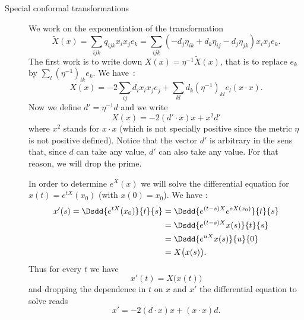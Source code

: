 \begin{description}
\item[Special conformal transformations]

    We work on the exponentiation of the transformation
    \begin{equation}
        \tilde X(x)=\sum_{ijk}q_{ijk}x_ix_je_k=\sum_{ijk}(-d_j\eta_{ik}+d_k\eta_{ij}-d_j\eta_{jk})x_ix_je_k.
    \end{equation}
    The first work is to write down \( X(x)=\eta^{-1}\tilde X(x)\), that is to replace \( e_k\) by \( \sum_l(\eta^{-1})_{lk}e_k\). We have~:
    \begin{equation}
        X(x)=-2\sum_{ij}d_ix_ix_je_j+\sum_{kl}d_k(\eta^{-1})_{kl}e_l(x\cdot x).
    \end{equation}
    Now we define \( d'=\eta^{-1}d\) and we write
    \begin{equation}
        X(x)=-2(d'\cdot x)x+x^2d'
    \end{equation}
    where \( x^2\) stands for \( x\cdot x\) (which is not specially positive since the metric \( \eta\) is not positive defined). Notice that the vector \( d'\) is arbitrary in the sens that, since \( d\) can take any value, \( d'\) can also take any value. For that reason, we will drop the prime.

    In order to determine \(  e^{X}(x)\) we will solve the differential equation for \( x(t)= e^{tX}(x_0)\) (with \( x(0)=x_0\)). We have :
    \begin{subequations}
        \begin{align}
            x'(s)=\Dsdd{  e^{tX}(x_0) }{t}{s}&=\Dsdd{  e^{(t-s)X}   e^{sX(x_0)}  }{t}{s}\\
            &=\Dsdd{  e^{(t-s)X}x(s) }{t}{s}\\
            &=\Dsdd{  e^{uX}x(s) }{u}{0}\\
            &=X\big( x(s) \big).
        \end{align}
    \end{subequations}
    Thus for every \( t\) we have
    \begin{equation}
        x'(t)=X\big( x(t) \big)
    \end{equation}
    and dropping the dependence in \( t\) on \( x\) and \( x'\) the differential equation to solve reads\cite{ooUCSPooYwxHzL}
    \begin{equation}
        x'=-2(d\cdot x)x+(x\cdot x)d.
    \end{equation}


\end{description}
